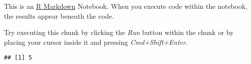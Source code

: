 This is an \href{http://rmarkdown.rstudio.com}{R Markdown} Notebook.
When you execute code within the notebook, the results appear beneath
the code.

Try executing this chunk by clicking the \emph{Run} button within the
chunk or by placing your cursor inside it and pressing
\emph{Cmd+Shift+Enter}.

\begin{Shaded}
\begin{Highlighting}[]
\OtherTok{\textless{}{-}}
\end{Highlighting}
\end{Shaded}

\begin{verbatim}
## [1] 5
\end{verbatim}

